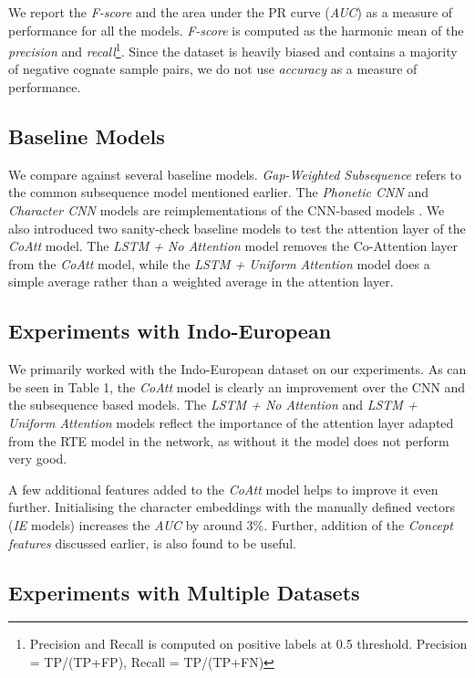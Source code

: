 \documentclass[11pt,letterpaper]{article}
\begin{document}
We report the \textit{F-score} and the area under the PR curve (\textit{AUC}) as a measure of performance for all the models. \textit{F-score} is computed as the harmonic mean of the \textit{precision} and \textit{recall}\footnote{Precision and Recall is computed on positive labels at 0.5 threshold. Precision = TP/(TP+FP), Recall = TP/(TP+FN)}. Since the dataset is heavily biased and contains a majority of negative cognate sample pairs, we do not use \textit{accuracy} as a measure of performance.

\subsection{Baseline Models}

We compare against several baseline models. \textit{Gap-Weighted Subsequence} refers to the common subsequence model \cite{rama2015automatic} mentioned earlier. The \textit{Phonetic CNN} and \textit{Character CNN} models are reimplementations of the CNN-based models \cite{rama2016siamese}. We also introduced two sanity-check baseline models to test the attention layer of the \textit{CoAtt} model. The \textit{LSTM + No Attention} model removes the Co-Attention layer from the \textit{CoAtt} model, while the \textit{LSTM + Uniform Attention} model does a simple average rather than a weighted average in the attention layer.

\subsection{Experiments with Indo-European}

We primarily worked with the Indo-European dataset on our experiments. As can be seen in Table 1, the \textit{CoAtt} model is clearly an improvement over the CNN and the subsequence based models. The \textit{LSTM + No Attention} and \textit{LSTM + Uniform Attention} models reflect the importance of the attention layer adapted from the RTE model in the network, as without it the model does not perform very good. 

A few additional features added to the \textit{CoAtt} model helps to improve it even further. Initialising the character embeddings with the manually defined vectors (\textit{IE} models) increases the \textit{AUC} by around 3\%. Further, addition of the \textit{Concept features} discussed earlier, is also found to be useful.

\subsection{Experiments with Multiple Datasets}
\end{document}
